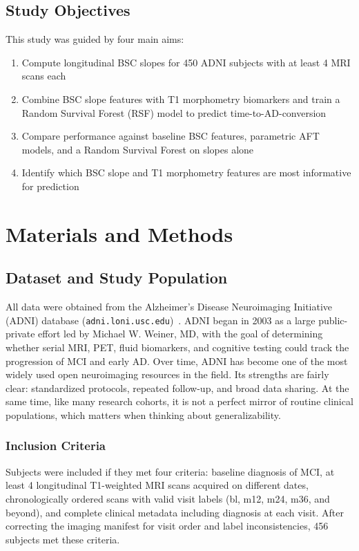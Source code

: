 \documentclass[blue]{ludusofficial}
\begin{document}
\subsection{Study Objectives}

This study was guided by four main aims:

\begin{enumerate}
    \item Compute longitudinal BSC slopes for 450 ADNI subjects with at least 4 MRI scans each
    \item Combine BSC slope features with T1 morphometry biomarkers and train a Random Survival Forest (RSF) model to predict time-to-AD-conversion
    \item Compare performance against baseline BSC features, parametric AFT models, and a Random Survival Forest on slopes alone
    \item Identify which BSC slope and T1 morphometry features are most informative for prediction
\end{enumerate}

\section{Materials and Methods}

\subsection{Dataset and Study Population}

All data were obtained from the Alzheimer's Disease Neuroimaging Initiative (ADNI) database (\texttt{adni.loni.usc.edu})~\cite{weiner2010adni,petersen2010adni}. ADNI began in 2003 as a large public-private effort led by Michael W. Weiner, MD, with the goal of determining whether serial MRI, PET, fluid biomarkers, and cognitive testing could track the progression of MCI and early AD. Over time, ADNI has become one of the most widely used open neuroimaging resources in the field. Its strengths are fairly clear: standardized protocols, repeated follow-up, and broad data sharing. At the same time, like many research cohorts, it is not a perfect mirror of routine clinical populations, which matters when thinking about generalizability.

\subsubsection{Inclusion Criteria}

Subjects were included if they met four criteria: baseline diagnosis of MCI, at least 4 longitudinal T1-weighted MRI scans acquired on different dates, chronologically ordered scans with valid visit labels (bl, m12, m24, m36, and beyond), and complete clinical metadata including diagnosis at each visit. After correcting the imaging manifest for visit order and label inconsistencies, 456 subjects met these criteria.
\end{document}
